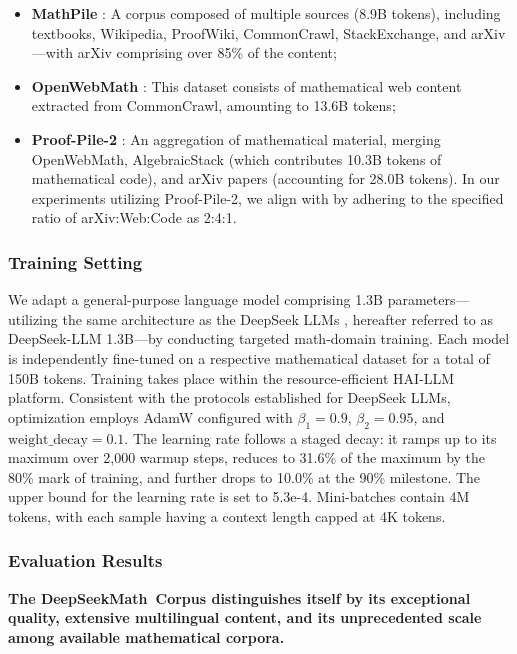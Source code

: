 \begin{itemize}[topsep=0pt]
\begin{itemize}[topsep=0pt]
    \item \textbf{MathPile} \citep{mathpile}: A corpus composed of multiple sources (8.9B tokens), including textbooks, Wikipedia, ProofWiki, CommonCrawl, StackExchange, and arXiv—with arXiv comprising over 85\% of the content;
    \item \textbf{OpenWebMath} \citep{openwebmath}: This dataset consists of mathematical web content extracted from CommonCrawl, amounting to 13.6B tokens;
    \item \textbf{Proof-Pile-2} \citep{llemma}: An aggregation of mathematical material, merging OpenWebMath, AlgebraicStack (which contributes 10.3B tokens of mathematical code), and arXiv papers (accounting for 28.0B tokens). In our experiments utilizing Proof-Pile-2, we align with \cite{llemma} by adhering to the specified ratio of arXiv:Web:Code as 2:4:1.
\end{itemize}

\subsubsection{Training Setting}
\label{sec:quality-policy}
We adapt a general-purpose language model comprising 1.3B parameters—utilizing the same architecture as the DeepSeek LLMs \citep{deepseek-llm}, hereafter referred to as DeepSeek-LLM 1.3B—by conducting targeted math-domain training. Each model is independently fine-tuned on a respective mathematical dataset for a total of 150B tokens. Training takes place within the resource-efficient HAI-LLM \citep{haillm} platform. Consistent with the protocols established for DeepSeek LLMs, optimization employs AdamW \citep{adamW} configured with $\beta_1=0.9$, $\beta_2=0.95$, and $\mathrm{weight\_decay}=0.1$. The learning rate follows a staged decay: it ramps up to its maximum over 2,000 warmup steps, reduces to 31.6\% of the maximum by the 80\% mark of training, and further drops to 10.0\% at the 90\% milestone. The upper bound for the learning rate is set to 5.3e-4. Mini-batches contain 4M tokens, with each sample having a context length capped at 4K tokens.

\subsubsection{Evaluation Results}

\textbf{The DeepSeekMath~Corpus distinguishes itself by its exceptional quality, extensive multilingual content, and its unprecedented scale among available mathematical corpora.}


\end{itemize}
